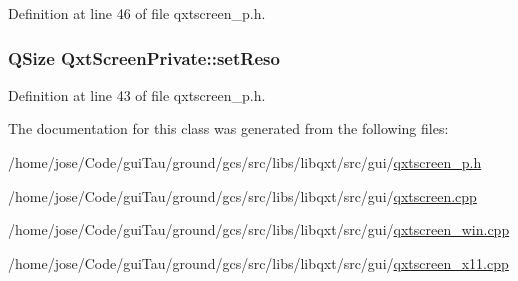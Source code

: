 Definition at line 46 of file qxtscreen\-\_\-p.\-h.

\hypertarget{class_qxt_screen_private_a5f0b0f442c884ee16b500a6d398b9136}{
\subsubsection[{set\-Reso}]{\setlength{\rightskip}{0pt plus 5cm}Q\-Size Qxt\-Screen\-Private\-::set\-Reso}}\label{class_qxt_screen_private_a5f0b0f442c884ee16b500a6d398b9136}


Definition at line 43 of file qxtscreen\-\_\-p.\-h.



The documentation for this class was generated from the following files\-:\begin{DoxyCompactItemize}
\item 
/home/jose/\-Code/gui\-Tau/ground/gcs/src/libs/libqxt/src/gui/\hyperlink{qxtscreen__p_8h}{qxtscreen\-\_\-p.\-h}\item 
/home/jose/\-Code/gui\-Tau/ground/gcs/src/libs/libqxt/src/gui/\hyperlink{qxtscreen_8cpp}{qxtscreen.\-cpp}\item 
/home/jose/\-Code/gui\-Tau/ground/gcs/src/libs/libqxt/src/gui/\hyperlink{qxtscreen__win_8cpp}{qxtscreen\-\_\-win.\-cpp}\item 
/home/jose/\-Code/gui\-Tau/ground/gcs/src/libs/libqxt/src/gui/\hyperlink{qxtscreen__x11_8cpp}{qxtscreen\-\_\-x11.\-cpp}\end{DoxyCompactItemize}
